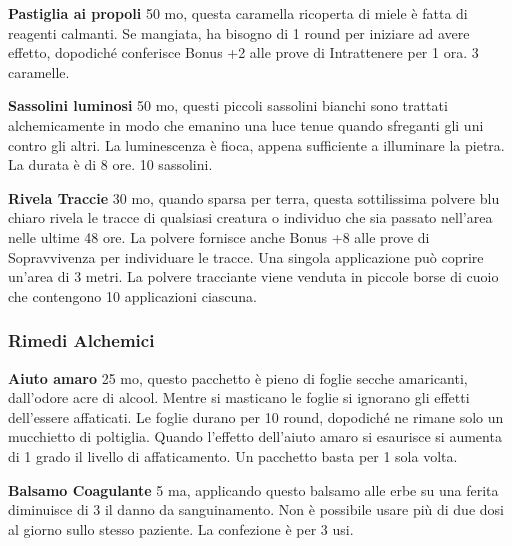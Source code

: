 \begin{multicols}{2}

\textbf{Pastiglia ai propoli} 50 mo, questa caramella ricoperta di miele è fatta di reagenti calmanti. Se mangiata, ha bisogno di 1 round per iniziare ad avere effetto, dopodiché conferisce Bonus +2 alle prove di Intrattenere per 1 ora. 3 caramelle.

\textbf{Sassolini luminosi} 50 mo, questi piccoli sassolini bianchi sono trattati alchemicamente in modo che emanino una luce tenue quando sfreganti gli uni contro gli altri. La luminescenza è fioca, appena sufficiente a illuminare la pietra. La durata è di 8 ore. 10 sassolini.

\textbf{Rivela Traccie} 30 mo, quando sparsa per terra, questa sottilissima polvere blu chiaro rivela le tracce di qualsiasi creatura o individuo che sia passato nell'area nelle ultime 48 ore.
La polvere fornisce anche Bonus +8 alle prove di Sopravvivenza per individuare le tracce. Una singola applicazione può coprire un'area di 3 metri. La polvere tracciante viene venduta in piccole borse di cuoio che contengono 10 applicazioni ciascuna.

\subsubsection{Rimedi Alchemici}

\label{rimedi-alchemici}

\textbf{Aiuto amaro} 25 mo, questo pacchetto è pieno di foglie secche amaricanti, dall'odore acre di alcool. Mentre si masticano le foglie si ignorano gli effetti dell'essere affaticati. Le foglie durano per 10 round, dopodiché ne rimane solo un mucchietto di poltiglia.
Quando l'effetto dell'aiuto amaro si esaurisce si aumenta di 1 grado il livello di affaticamento. Un pacchetto basta per 1 sola volta.


\textbf{Balsamo Coagulante} 5 ma, applicando questo balsamo alle erbe su una ferita diminuisce di 3 il danno da sanguinamento. Non è possibile usare più di due dosi al giorno sullo stesso paziente. La confezione è per 3 usi.


\end{multicols}
